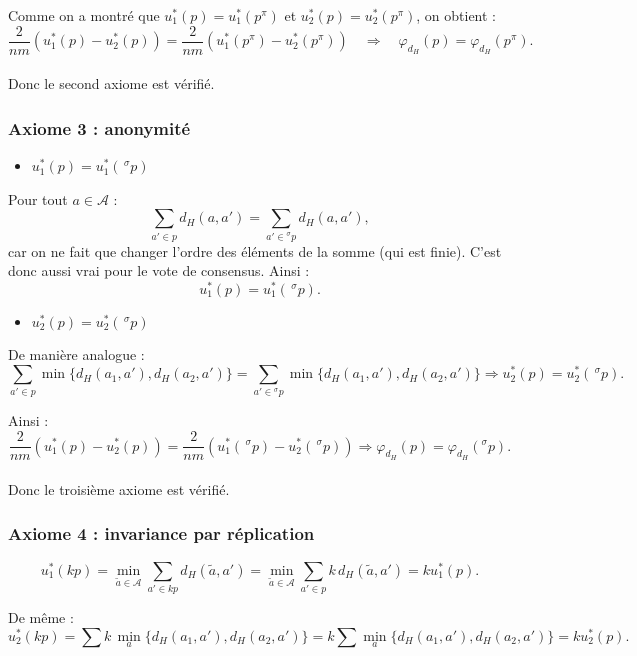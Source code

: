 \documentclass[11pt]{article}
\begin{document}
Comme on a montré que $u_1^*(p) = u_1^*(p^\pi)$ et $u_2^*(p) = u_2^*(p^\pi)$, on obtient :
\[
\frac{2}{n m}(u_1^*(p) - u_2^*(p))
= \frac{2}{n m}(u_1^*(p^\pi) - u_2^*(p^\pi))
\quad \Rightarrow \quad
\varphi_{d_H}(p) = \varphi_{d_H}(p^\pi).
\]
\\

Donc le second axiome est vérifié.


\subsubsection{Axiome 3 : anonymité}

\begin{itemize}
  \item $u_1^*(p) = u_1^*(\,^{\sigma}p)$
\end{itemize}

Pour tout $a \in \mathcal{A}$ :
\[
\sum_{a' \in p} d_H(a,a') 
= \sum_{a' \in {}^{\sigma}p} d_H(a,a'),
\]
car on ne fait que changer l’ordre des éléments de la somme (qui est finie).  
C’est donc aussi vrai pour le vote de consensus. Ainsi :
\[
u_1^*(p) = u_1^*(\,^{\sigma}p).
\]


\begin{itemize}
  \item $u_2^*(p) = u_2^*(\,^{\sigma}p)$
\end{itemize}

De manière analogue :
\[
\sum_{a' \in p} \min \{ d_H(a_1, a'), d_H(a_2, a') \}
= \sum_{a' \in {}^{\sigma}p} \min \{ d_H(a_1,a'), d_H(a_2,a') \}
\Rightarrow
u_2^*(p) = u_2^*(\,^{\sigma}p).
\]

Ainsi :
\[
\frac{2}{n m}(u_1^*(p) - u_2^*(p))
= \frac{2}{n m}(u_1^*(\,^{\sigma}p) - u_2^*(\,^{\sigma}p))
\Rightarrow
\varphi_{d_H}(p) = \varphi_{d_H}({}^{\sigma}p).
\]
\\

Donc le troisième axiome est vérifié.


\subsubsection{Axiome 4 : invariance par réplication}

\[
u_1^*(k p)
= \min_{\tilde{a} \in \mathcal{A}} \sum_{a' \in k p} d_H(\tilde{a}, a') 
= \min_{\tilde{a} \in \mathcal{A}} \sum_{a' \in p} k \, d_H(\tilde{a}, a')
= k u_1^*(p).
\]

De même :
\[
u_2^*(k p)
= \sum k \, \min_a \{ d_H(a_1,a'), d_H(a_2,a') \}
= k \sum \min_a \{ d_H(a_1,a'), d_H(a_2,a') \}
= k u_2^*(p).
\]
\end{document}

